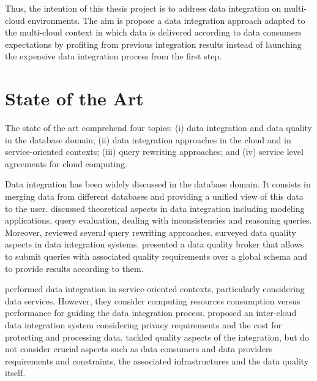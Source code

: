 %
Thus, the intention of this thesis project is to address data integration on multi-cloud 
environments.
%
The aim is propose a data integration approach adapted to the multi-cloud context in 
which data is delivered according to data consumers expectations by profiting from 
previous integration results instead of launching the expensive data integration 
process from the first step. 


\section{State of the Art}

The state of the art comprehend four topics: 
(i) data integration and data quality in the database domain; 
(ii) data integration approaches in the cloud and in service-oriented contexts; 
(iii) query rewriting approaches; and 
(iv) service level agreements for cloud computing.

Data integration has been widely discussed in the database domain.
It consists in merging data from different databases and providing a unified view of this data to the user.
\cite{Lenzerini:2002} discussed theoretical aspects in data integration including modeling applications, query evaluation, dealing with inconsistencies and reasoning queries.
Moreover, \cite{Halevy:2001} reviewed several query rewriting approaches. 
\cite{Batini2006} surveyed data quality aspects in data integration systems. 
\cite{Scannapieco:2004} presented a data quality broker that allows to submit queries with associated quality requirements over a global schema and to provide results according to them.

\cite{Correndo2010,ElSheikh2013} performed data integration in service-oriented contexts, particularly considering data services. However, they  consider computing resources consumption versus performance for guiding the data integration process. 
\cite{Tian2010} proposed an inter-cloud data integration system considering privacy requirements and the cost for protecting and processing data. 
\cite{Scannapieco:2004,Tian2010,YauY08} tackled quality aspects of the integration, but do not consider crucial aspects such as data consumers and data providers requirements and constraints, the associated infrastructures and the data quality itself. %

